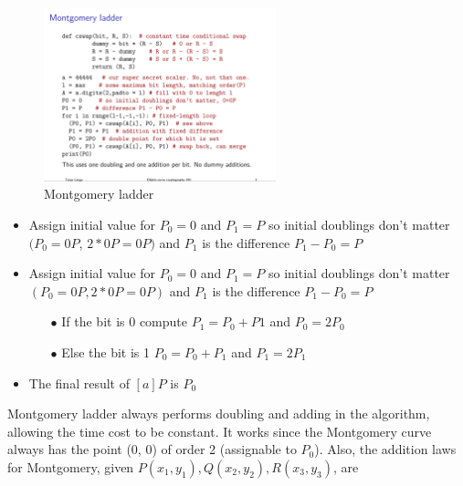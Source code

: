 \begin{figure}[ht!]
  \centering
  \includegraphics[width=0.6\textwidth]{images/montgomery_ladder.png}
  \caption[Montgomery ladder]{Montgomery ladder}
  \label{fig:montgomery_ladder}
\end{figure}

\begin{itemize}
  \item Assign initial value for $P_0 = 0$ and $P_1 = P$ so initial doublings don’t matter $(P_0 =0P$, $2*0P = 0P)$ and $P_1$ is the difference $P_1 - P_0 = P$
  \item Assign initial value for $P_0 = 0$ and $P_1 = P$ so initial doublings don’t matter $(P_0 =0P, 2*0P = 0P)$ and $P_1$ is the difference $P_1 - P_0 = P$

        \begin{itemize}
          \item[$\bullet$] If the bit is 0 compute $P_1 = P_0 +  P1$ and $P_0 = 2P_0$
          \item[$\bullet$] Else the bit is 1 $P_0 = P_0 +  P_1$ and $P_1 = 2P_1$
        \end{itemize}

  \item The final result of $[a]P$ is $P_0$
\end{itemize}

Montgomery ladder always performs doubling and adding in the algorithm, allowing the time cost to be constant. It works since the Montgomery curve always has the point (0, 0) of order 2 (assignable to $P_0$). Also, the addition laws for Montgomery, given $P(x_1, y_1), Q(x_2, y_2), R(x_3, y_3)$, are

